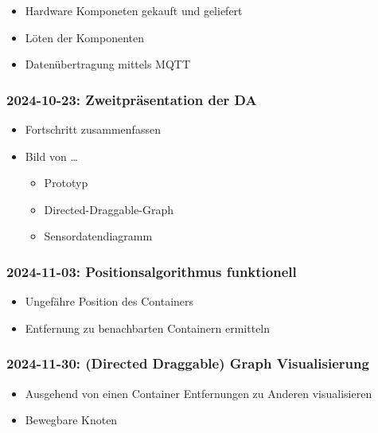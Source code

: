 \documentclass[
    headings=optiontotocandhead,%
    twoside,
    numbers=noenddot,%
    12pt, %
    titlepage, %
    parskip=full, %
    listof=leveldown, 
    numbers=noenddot, %
    a4paper,DIV=14,
    BCOR=15mm,
]{scrbook}
\providecommand{\tightlist}{%
  \setlength{\itemsep}{0pt}\setlength{\parskip}{0pt}}
\begin{document}
\begin{itemize}
\tightlist
\item
  Hardware Komponeten gekauft und geliefert
\item
  Löten der Komponenten
\item
  Datenübertragung mittels MQTT
\end{itemize}

\hypertarget{zweitpruxe4sentation-der-da}{%
\subsubsection{2024-10-23: Zweitpräsentation der
DA}\label{zweitpruxe4sentation-der-da}}

\begin{itemize}
\tightlist
\item
  Fortschritt zusammenfassen
\item
  Bild von \ldots{}

  \begin{itemize}
  \tightlist
  \item
    Prototyp
  \item
    Directed-Draggable-Graph
  \item
    Sensordatendiagramm
  \end{itemize}
\end{itemize}

\hypertarget{positionsalgorithmus-funktionell}{%
\subsubsection{2024-11-03: Positionsalgorithmus
funktionell}\label{positionsalgorithmus-funktionell}}

\begin{itemize}
\tightlist
\item
  Ungefähre Position des Containers
\item
  Entfernung zu benachbarten Containern ermitteln
\end{itemize}

\hypertarget{directed-draggable-graph-visualisierung}{%
\subsubsection{2024-11-30: (Directed Draggable) Graph
Visualisierung}\label{directed-draggable-graph-visualisierung}}

\begin{itemize}
\tightlist
\item
  Ausgehend von einen Container Entfernungen zu Anderen visualisieren
\item
  Bewegbare Knoten
\end{itemize}
\end{document}
